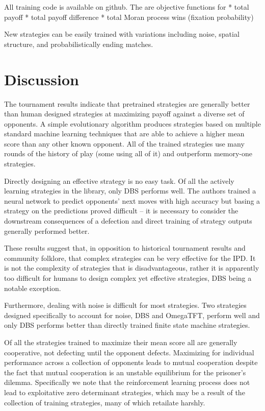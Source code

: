 \documentclass{article}
\begin{document}

All training code is available on github. The are objective functions for
* total payoff
* total payoff difference
* total Moran process wins (fixation probability)

New strategies can be easily trained with variations including noise, spatial
structure, and probabilistically ending matches.

\section{Discussion}

The tournament results indicate that pretrained strategies are generally better
than human designed strategies at maximizing payoff against a diverse set of
opponents. A simple evolutionary algorithm produces strategies based on multiple
standard machine learning techniques that are able to achieve a higher mean
score than any other known opponent. All of the trained strategies use many
rounds of the history of play (some using all of it) and outperform memory-one
strategies.

Directly designing an effective strategy is no easy task. Of all the actively
learning strategies in the library, only DBS performs well. The authors trained
a neural network to predict opponents' next moves with high accuracy but basing
a strategy on the predictions proved difficult -- it is necessary to consider
the downstream consequences of a defection and direct training of strategy
outputs generally performed better.

These results suggest that, in opposition to historical tournament results
and community folklore, that complex strategies can be very effective for the
IPD. It is not the complexity of strategies that is disadvantageous, rather it
is apparently too difficult for humans to design complex yet effective
strategies, DBS being a notable exception.

Furthermore, dealing with noise is difficult for most strategies. Two strategies
designed specifically to account for noise, DBS and OmegaTFT, perform well and
only DBS performs better than directly trained finite state machine strategies.

Of all the strategies trained to maximize their mean score all are generally
cooperative, not defecting until the opponent defects. Maximizing for individual
performance across a collection of opponents leads to mutual cooperation despite
the fact that mutual cooperation is an unstable equilibrium for the prisoner's
dilemma. Specifically we note that the reinforcement learning process does not
lead to exploitative zero determinant strategies, which may be a result of the
collection of training strategies, many of which retailate harshly.
\end{document}
